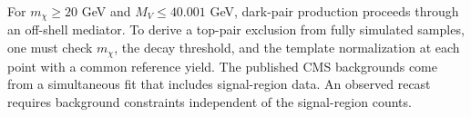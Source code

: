 For $m_\chi\ge20$ GeV and $M_V\le40.001$ GeV, dark-pair production proceeds through an off-shell mediator. To derive a top-pair exclusion from fully simulated samples, one must check $m_\chi$, the decay threshold, and the template normalization at each point with a common reference yield. The published CMS backgrounds come from a simultaneous fit that includes signal-region data. An observed recast requires background constraints independent of the signal-region counts. \cite{cmstop}
